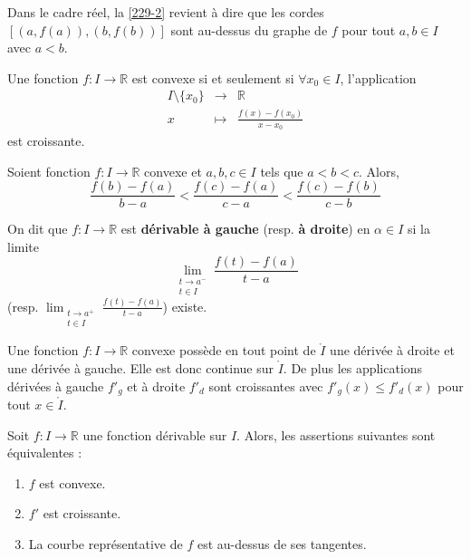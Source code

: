 
	\begin{remark}
		Dans le cadre réel, la \cref{229-2} revient à dire que les cordes $[(a, f(a)), (b, f(b))]$ sont au-dessus du graphe de $f$ pour tout $a, b \in I$ avec $a < b$.
	\end{remark}

	\begin{proposition}
		Une fonction $f : I \rightarrow \mathbb{R}$ est convexe si et seulement si $\forall x_0 \in I$, l'application
		\[
		\begin{array}{ccc}
			I \setminus \{ x_0 \} &\rightarrow& \mathbb{R} \\
			x &\mapsto& \frac{f(x) - f(x_0)}{x - x_0}
		\end{array}
		\]
		est croissante.
	\end{proposition}

	\begin{corollary}
		Soient fonction $f : I \rightarrow \mathbb{R}$ convexe et $a, b, c \in I$ tels que $a < b < c$. Alors,
		\[ \frac{f(b) - f(a)}{b-a} < \frac{f(c) - f(a)}{c-a} < \frac{f(c) - f(b)}{c-b} \]
	\end{corollary}


	\begin{definition}
		On dit que $f : I \rightarrow \mathbb{R}$ est \textbf{dérivable à gauche} (resp. \textbf{à droite}) en $\alpha \in I$ si la limite
		\[ \lim_{\substack{t \rightarrow a^{-} \\ t \in I}} \frac{f(t) - f(a)}{t-a} \]
		(resp. $\lim_{\substack{t \rightarrow a^{+} \\ t \in I}} \frac{f(t) - f(a)}{t-a}$) existe.
	\end{definition}


	\begin{proposition}
		Une fonction $f : I \rightarrow \mathbb{R}$ convexe possède en tout point de $\mathring{I}$ une dérivée à droite et une dérivée à gauche. Elle est donc continue sur $\mathring{I}$. De plus les applications dérivées à gauche $f'_g$ et à droite $f'_d$ sont croissantes avec $f'_g(x) \leq f'_d(x)$ pour tout $x \in \mathring{I}$.
	\end{proposition}

	\begin{theorem}
		Soit $f : I \rightarrow \mathbb{R}$ une fonction dérivable sur $I$. Alors, les assertions suivantes sont équivalentes :
		\begin{enumerate}[label=(\roman*)]
			\item $f$ est convexe.
			\item $f'$ est croissante.
			\item La courbe représentative de $f$ est au-dessus de ses tangentes.
		\end{enumerate}
	\end{theorem}

